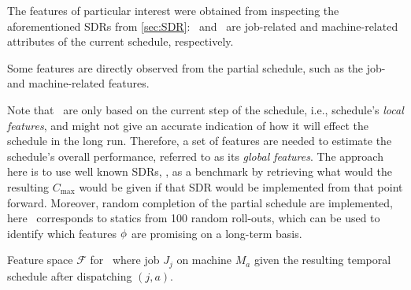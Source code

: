 The features of particular interest were obtained from inspecting the aforementioned SDRs from \cref{sec:SDR}:  
\phiJobRelated\ and \phiMacRelated\ are job-related and machine-related attributes of the current schedule, respectively. 

Some features are directly observed from the partial schedule, such as the job- and machine-related features. 

Note that \phiLocalRelated\ are only based on the current step of the schedule, 
i.e., schedule's \emph{local features}, and might not give an accurate 
indication of how it will effect the schedule in the long run. Therefore, a set 
of features are needed to estimate the schedule's overall performance, referred 
to as its \emph{global features}. The approach here is to use well known SDRs, 
\phiSDRRelated, as a benchmark by retrieving what would the resulting 
$C_{\max}$ would be given if that SDR would be implemented from that point 
forward. Moreover, random completion of the partial schedule are implemented, 
here \phiRNDRelated\ corresponds to statics from 100 random roll-outs, which 
can be used to identify which features ${\mathbf{\phi}}$ are promising on a long-term 
basis.  


\begin{table} \centering 
	\caption[Feature space $\mathcal{F}$ for \JSP]{Feature space $\mathcal{F}$ for \JSP\ where job $J_j$ on machine $M_a$ given the resulting temporal schedule after dispatching $(j,a)$.}
	\label{tbl:features}
	
\end{table}



